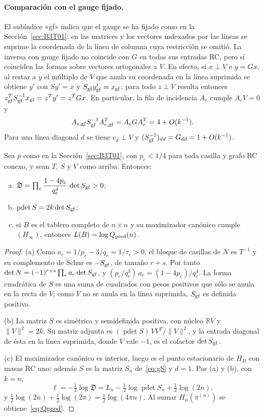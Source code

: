 \paragraph{Comparación con el gauge fijado.}
El subíndice «gf» indica que el gauge se ha fijado como en la Sección~\ref{sec:B3T01}: en las matrices
y los vectores indexados por las líneas se suprime la coordenada de la línea de columna cuya
restricción se omitió.
La inversa con gauge fijado no coincide con $G$ en todas sus entradas RC,
pero sí coinciden las formas sobre vectores ortogonales a $V$.
En efecto, si $x\perp V$ e $y=Gx$, al restar a $y$ el múltiplo de $V$ que anula su coordenada en la
línea suprimida se obtiene $y'$ con $Sy'=x$ y $S_{\rm gf}y'_{\rm gf}=x_{\rm gf}$; para todo
$z\perp V$ resulta entonces $z_{\rm gf}^TS_{\rm gf}^{-1}x_{\rm gf}=z^Ty'=z^TGx$.
En particular, la fila de incidencia $A_e$ cumple $A_eV=0$ y
\[
 A_{e,\rm gf}S_{\rm gf}^{-1}A_{e,\rm gf}^T=A_eGA_e^T=4+O(k^{-1}).
\]
Para una línea diagonal $d$ se tiene $e_d\perp V$ y
$(S_{\rm gf}^{-1})_{dd}=G_{dd}=1+O(k^{-1})$.

\begin{lema}\label{lem:puente}
Sea $p$ como en la Sección~\ref{sec:B3T01}, con $p_e<1/4$ para toda casilla y grafo RC conexo, y
sean $T$, $S$ y $V$ como arriba. Entonces:
\begin{enumerate}[(a)]
\item $\mathfrak D=\prod_e\dfrac{1-4p_e}{q_e^4}\,\det S_{\rm gf}>0$;
\item $\operatorname{pdet}S=2k\det S_{\rm gf}$;
\item si $B$ es el tablero completo de $n\times n$ y su maximizador canónico cumple $(H_\infty)$,
 entonces $L(B)=\log Q_{\rm pred}(n)$.
\end{enumerate}
\end{lema}
\begin{proof}
(a) Como $a_e=1/p_e-3/q_e=1/\tau_e>0$, el bloque de casillas de $N$ es $T^{-1}$ y su complemento de
Schur es $-S_{\rm gf}$, de tamaño $r+s$. Por tanto $\det N=(-1)^{r+s}\prod_ea_e\det S_{\rm gf}$, y
$(p_e/q_e^3)\,a_e=(1-4p_e)/q_e^4$. La forma cuadrática de $S$ es una suma de cuadrados con pesos
positivos que sólo se anula en la recta de $V$; como $V$ no se anula en la línea suprimida,
$S_{\rm gf}$ es definida positiva.

(b) La matriz $S$ es simétrica y semidefinida positiva, con núcleo $\mathbb RV$ y $\|V\|^2=2k$. Su
matriz adjunta es $(\operatorname{pdet}S)\,VV^T/\|V\|^2$, y la entrada diagonal de ésta en la línea
suprimida, donde $V$ vale $-1$, es el cofactor $\det S_{\rm gf}$.

(c) El maximizador canónico es interior, luego es el punto estacionario de $H_B$ con masas RC uno;
además $S$ es la matriz $S_n$ de~\eqref{eq:gS} y $d=1$. Por (a) y (b), con $k=n$,
\[
 \ell=-\tfrac12\log\mathfrak D=L_n-\tfrac12\log\operatorname{pdet}S_n+\tfrac12\log(2n),
\]
y $\tfrac12\log(2n)+\tfrac12\log(2\pi)=\tfrac12\log(4\pi n)$. Al sumar $H_n(\pi^{(n)})$ se
obtiene~\eqref{eq:Qpred}.
\end{proof}
